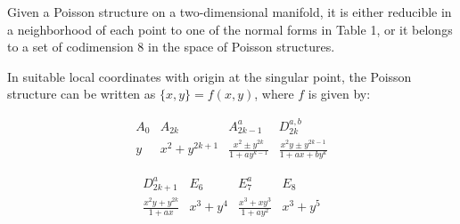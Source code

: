 Given a Poisson structure on a two-dimensional manifold, it is either reducible in a neighborhood of each point to one of the normal forms in Table 1, or it belongs to a set of codimension 8 in the space of Poisson structures.

In suitable local coordinates with origin at the singular point, the Poisson structure can be written as $\{x, y\} = f(x, y)$, where $f$ is given by:

$$\begin{array}{cccc}
A_0 & A_{2k} & A_{2k-1}^a & D_{2k}^{a,b} \\
y & x^2 + y^{2k+1} & \frac{x^2 \pm y^{2k}}{1 + ay^{k-1}} & \frac{x^2 y \pm y^{2k-1}}{1 + ax + by^k}
\end{array}$$

$$\begin{array}{cccc}
D_{2k+1}^a & E_6 & E_7^a & E_8 \\
\frac{x^2 y + y^{2k}}{1 + ax} & x^3 + y^4 & \frac{x^3 + xy^3}{1 + ay^2} & x^3 + y^5
\end{array}$$
